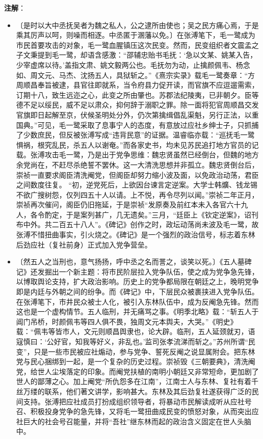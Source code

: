 \documentclass[12pt,UTF-8,openany,a4]{ctexbook}
\begin{document}
\newpage

\begin{Large}
   \noindent \textbf{注解}：
\end{Large}

\vspace{-1em}

\begin{itemize}
    \setlength\itemsep{-0.2em}
    \item〔是时以大中丞抚吴者为魏之私人，公之逮所由使也；吴之民方痛心焉，于是乘其厉声以呵，则噪而相逐。中丞匿于溷藩以免。〕{\yiwen 在张溥笔下，毛一鹭成为市民首要攻击的对象，毛一鹭血腥镇压这次民变。然而，民变组织者文震孟之子文秉提到毛一鹭，却语含感激：“邵辅忠贻书毛抚：‘急以文某、姚某入告，少宰虚席以待。’盖指文肃、姚文毅两公也。毛抚勿为动，止擒颜佩韦、杨念如、周文元、马杰、沈扬五人，具狱斩之。”《熹宗实录》载毛一鹭奏章：“方周顺昌奉旨被逮，县官往即就系，当令府县力促开读，而官旗不应逗遛需索，订期十八，致生远迩之心，此变之所由肇也。苏郡法纪陵夷，已非朝夕。臣等德不足以绥民，威不足以肃众，抑何辞于溺职之罪。除一面将犯官周顺昌交发官旗即日起解至京，伏候圣明处分外，仍次第擒缉倡乱渠魁，另行正法，以重国典。”可见，毛一鹭采取了息事宁人的态度，有意放过应社乡绅士子，只抓捕了少数庶民，但反被张溥写成“违背民意”的证据。温睿临亦载：“巡抚毛一鹭惧祸，根究乱民，杀五人以谢奄。”而各家史书，均未见苏民追打地方官员的记载。张溥攻击毛一鹭，乃是出于党争思维：魏忠贤虽然已经倒台，但魏的地方余党尚在，不赶尽杀绝誓不罢休。这一大清洗思想并非孤立。魏忠贤倒台后，崇祯一直要求阁臣清洗阉党，但阁臣却努力缩小波及面，以免政治动荡，君臣之间数度往复。 “初，逆党死后，上欲因台谏言定逆案。大学士韩爌、钱龙锡不欲广搜树怨，仅列四五十人以请。上不悦，再令尽列以闻。”崇祯二年正月，崇祯再次催问，阁臣仍旧拖延，于是崇祯“发原奏及前红本未入各官六十九人，各令酌定，于是案列甚广，几无遗矣。”三月，“廷臣上《钦定逆案》，诏刊布中外。共二百五十八人”。《碑记》创作之时，政坛动荡尚未波及毛一鹭，故张溥不惜扭曲事实，引火烧之。《碑记》是一个强烈的政治信号，标志着东林后劲应社（复社前身）正式加入党争营垒。}
    \item〔然五人之当刑也，意气扬扬，呼中丞之名而詈之，谈笑以死。〕{\yiwen 《五人墓碑记》还发掘出一个新主题：将市民阶层拉入党争队伍，使之成为党争急先锋，以博取舆论支持，扩大政治影响。历史上的党争都局限在朝廷之上，晚明党争即是内廷与外朝之间的纷争。而《碑记》中，下层民众被裹挟进入党争队伍。在张溥笔下，市井民众被士人化，被引入东林队伍中，成为反阉急先锋。然而这也是一个虚构情节。五人临刑，并无痛骂之事。《明季北略》载：“斩五人于阊门吊桥，时颜佩韦等四人俱不畏，独周文元本舆夫，大哭。”《明史》载：“佩韦等皆市人，文元则顺昌舆隶也，论大辟。临刑，五人延颈就刃，语寇慎曰：‘公好官，知我等好义，非乱也。’监司张孝流涕而斩之。”苏州所谓“民变”，只是一些市民被应社煽动，参与党争、誓死反阉之说显属附会。把东林党与民心捆绑到一起，是一个复杂的历史过程。崇祯毁《三朝要典》，清洗阉党，给世人尘埃落定的印象。而阉党扶植的南明小朝廷又非常短命，更加剧了世人的鄙薄之心。加上阉党“所仇怨多在江南”，江南士人与东林、复社有着千丝万缕的联系，他们著文讲学，影响甚大。东林及其后劲复社遂获得广泛的民间支持。张溥把应社成员打扮成组织领导者，将暴动市民解读成听从应社号召、积极投身党争的急先锋，又将毛一鹭扭曲成民变的愤怒对象，从而突出应社巨大的社会号召能量，并将“吾社”继东林而起的政治含义固定在世人头脑中。}
\end{itemize}
\end{document}
